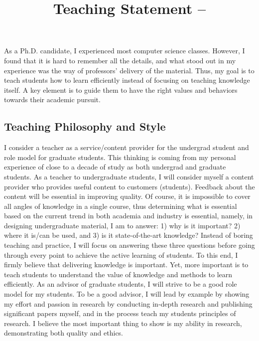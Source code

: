 \documentclass{NSF}
\begin{document}
\title{Teaching Statement -- }
\thispagestyle{empty}
As a Ph.D. candidate, I experienced most computer science classes. However, I found that it is hard to remember all the details, and what stood out in my experience was the way of professors' delivery of the material. Thus, my goal is to teach students how to learn efficiently instead of focusing on teaching knowledge itself. A key element is to guide them to have the right values and behaviors towards their academic pursuit.

\subsection*{Teaching Philosophy and Style}
I consider a teacher as a service/content provider for the undergrad student and role model for graduate students. This thinking is coming from my personal experience of close to a decade of study as both undergrad and graduate students. As a teacher to undergraduate students, I will consider myself a content provider who provides useful content to customers (students). Feedback about the content will be essential in improving quality. Of course, it is impossible to cover all angles of knowledge in a single course, thus determining what is essential based on the current trend in both academia and industry is essential, namely, in designing undergraduate material, I am to answer: 1) why is it important? 2) where it is/can be used, and 3) is it state-of-the-art knowledge? Instead of boring teaching and practice, I will focus on answering these three questions before going through every point to achieve the active learning of students. To this end, I firmly believe that delivering knowledge is important. Yet, more important is to teach students to understand the value of knowledge and methods to learn efficiently. As an advisor of graduate students, I will strive to be a good role model for my students. To be a good advisor, I will lead by example by showing my effort and passion in research by conducting in-depth research and publishing significant papers myself, and in the process teach my students principles of research. I believe the most important thing to show is my ability in research, demonstrating both quality and ethics. 
\end{document}
